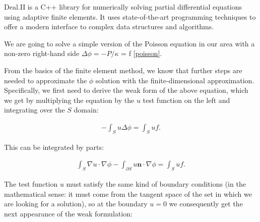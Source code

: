 \documentclass[]{pracamgr}
\begin{document}
      Deal.II\cite{dealII94} is a C++ library for numerically solving partial differential equations using adaptive finite elements. It uses state-of-the-art programming techniques to offer a modern interface to complex data structures and algorithms.

      We are going to solve a simple version of the Poisson equation in our area with a non-zero right-hand side $\Delta \phi = -P/\kappa$ = f \ref{poisson}.

      From the basics of the finite element method, we know that further steps are needed to approximate the $\phi$ solution with the finite-dimensional approximation. Specifically, we first need to derive the weak form of the above equation, which we get by multiplying the equation by the $u$ test function on the left and integrating over the $S$ domain:
      
      \begin{align*}
        -\int_S u \Delta \phi = \int_S u f.
      \end{align*}
      
      This can be integrated by parts:
      
      \begin{align*}
        \int_S \nabla u \cdot \nabla \phi
        -
        \int_{\partial S} u \mathbf{n}\cdot \nabla \phi
         = \int_S u f.
      \end{align*}
      
      The test function $u$ must satisfy the same kind of boundary conditions (in the mathematical sense: it must come from the tangent space of the set in which we are looking for a solution), so at the boundary $u=0$ we consequently get the next appearance of the weak formulation:
      
\end{document}
